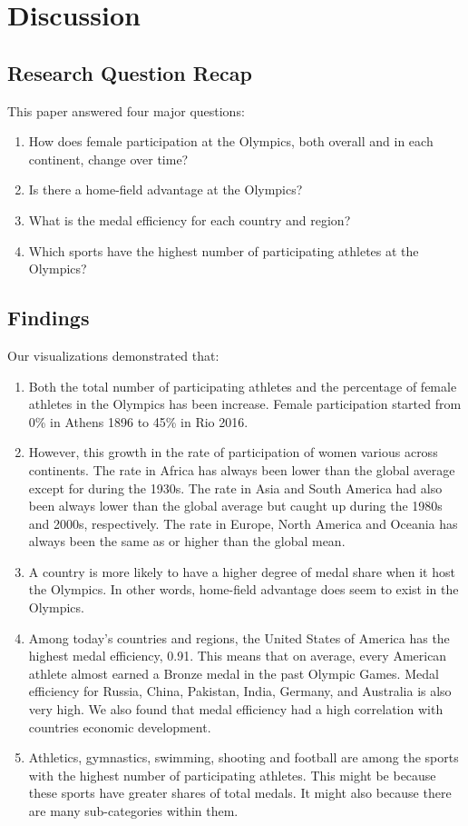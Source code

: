 \documentclass[12pt]{article}
\begin{document}
\section{Discussion}
\subsection{Research Question Recap}
This paper answered four major questions:
\begin{enumerate}
    \item How does female participation at the Olympics, both overall and in each continent, change over time?
    \item Is there a home-field advantage at the Olympics?
    \item What is the medal efficiency for each country and region?
    \item Which sports have the highest number of participating athletes at the Olympics?
\end{enumerate}

\subsection{Findings}
Our visualizations demonstrated that:
\begin{enumerate}
    \item Both the total number of participating athletes and the percentage of female athletes in the Olympics has been increase. Female participation started from 0\% in Athens 1896 to 45\% in Rio 2016. 
    \item However, this growth in the rate of participation of women various across continents. The rate in Africa has always been lower than the global average except for during the 1930s. The rate in Asia and South America had also been always lower than the global average but caught up during the 1980s and 2000s, respectively. The rate in Europe, North America and Oceania has always been the same as or higher than the global mean.
    \item A country is more likely to have a higher degree of medal share when it host the Olympics. In other words, home-field advantage does seem to exist in the Olympics. 
    \item Among today’s countries and regions, the United States of America has the highest medal efficiency, 0.91. This means that on average, every American athlete almost earned a Bronze medal in the past Olympic Games. Medal efficiency for Russia, China, Pakistan, India, Germany, and Australia is also very high. We also found that medal efficiency had a high correlation with countries economic development. 
    \item Athletics, gymnastics, swimming, shooting and football are among the sports with the highest number of participating athletes. This might be because these sports have greater shares of total medals. It might also because there are many sub-categories within them.
\end{enumerate}
\end{document}

